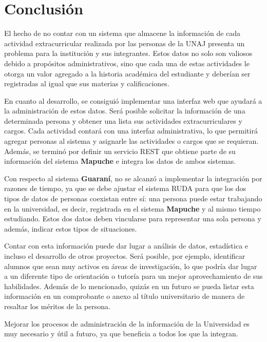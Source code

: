 
\section{Conclusión}
\label{sec:conclusion}
El hecho de no contar con un sistema que almacene la información de cada
actividad extracurricular realizada por las personas de la UNAJ presenta
un problema para la institución y sus integrantes\@. Estos datos
no solo son valiosos debido a propósitos administrativos, sino que cada una de
estas actividades le otorga un valor agregado a la historia académica del
estudiante y deberían ser registradas al igual que sus
materias y calificaciones.


En cuanto al desarrollo, se consiguió implementar una interfaz web que ayudará
a la administración de estos datos. Será posible solicitar la información de
una determinada persona y obtener una lista sus actividades extracurriculares y cargos\@.
Cada actividad contará con una interfaz administrativa, lo que
permitirá agregar personas al sistema y asignarle las actividades o cargos
que se requieran\@. Además, se terminó por definir un servicio REST que
obtiene parte de su información del sistema \textbf{Mapuche} e integra
los datos de ambos sistemas\@.


Con respecto al sistema \textbf{Guaraní}, no se alcanzó a implementar la
integración por razones de tiempo, ya que se debe ajustar el sistema RUDA para
que los dos tipos de datos de personas coexistan entre sí: una persona puede
estar trabajando en la universidad, es decir, registrada en el sistema
\textbf{Mapuche} y al mismo tiempo estudiando. Estos dos datos deben
vincularse para representar una sola persona y además, indicar estos tipos
de situaciones.

Contar con esta información puede dar lugar a análisis de datos,
estadística e incluso el desarrollo de otros proyectos. Será posible,
por ejemplo, identificar alumnos que sean muy activos en áreas de
investigación, lo que podría dar lugar a un diferente tipo de orientación
o tutoría para un mejor aprovechamiento de sus habilidades\@. Además de lo mencionado, quizás
en un futuro se pueda listar esta información en un comprobante o anexo al título universitario
de manera de resaltar los méritos de la persona.

Mejorar los procesos de administración de la información de la Universidad es muy necesario
y útil a futuro, ya que beneficia a todos los que la integran.

\newpage

